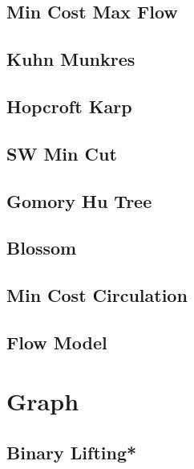 \subsection{Min Cost Max Flow}

\subsection{Kuhn Munkres}
\subsection{Hopcroft Karp}
\subsection{SW Min Cut}
\subsection{Gomory Hu Tree}
\subsection{Blossom}
\subsection{Min Cost Circulation}
\subsection{Flow Model}


\section{Graph}
\subsection{Binary Lifting*}

